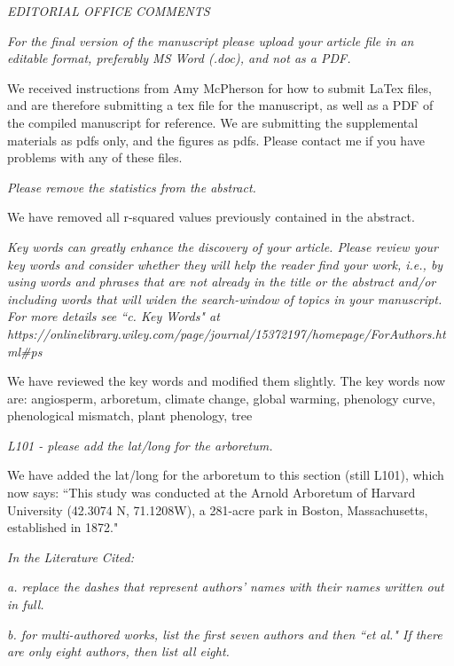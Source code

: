 \documentclass[10.95pt,a4paper]{letter}
\begin{document}
\par \emph{EDITORIAL OFFICE COMMENTS}

\par \emph{For the final version of the manuscript please upload your article file in an editable format, preferably MS Word (.doc), and not as a PDF.}
\par We received instructions from Amy McPherson for how to submit LaTex files, and are therefore submitting a tex file for the manuscript, as well as a PDF of the compiled manuscript for reference. We are submitting the supplemental materials as pdfs only, and the figures as pdfs. Please contact me if you have problems with any of these files.
 
\par \emph{Please remove the statistics from the abstract.}
\par We have removed all r-squared values previously contained in the abstract.

\par \emph{Key words can greatly enhance the discovery of your article. Please review your key words and consider whether they will help the reader find your work, i.e., by using words and phrases that are not already in the title or the abstract and/or including words that will widen the search-window of topics in your manuscript. For more details see ``c. Key Words" at https://onlinelibrary.wiley.com/page/journal/15372197/homepage/ForAuthors.html#ps} 
\par We have reviewed the key words and modified them slightly. The key words now are: angiosperm, arboretum, climate change, global warming, phenology curve, phenological mismatch, plant phenology, tree 
\par \emph{L101 - please add the lat/long for the arboretum.}
\par We have added the lat/long for the arboretum to this section (still L101), which now says: ``This study was conducted at the Arnold Arboretum of Harvard University (42.3074 \degree N, 71.1208\degree W), a 281-acre park in Boston, Massachusetts, established in 1872."

\par \emph{In the Literature Cited:}
\par \emph{a. replace the dashes that represent authors' names with their names written out in full.}

\par \emph{b. for multi-authored works, list the first seven authors and then ``et al." If there are only eight authors, then list all eight.}
\end{document}

